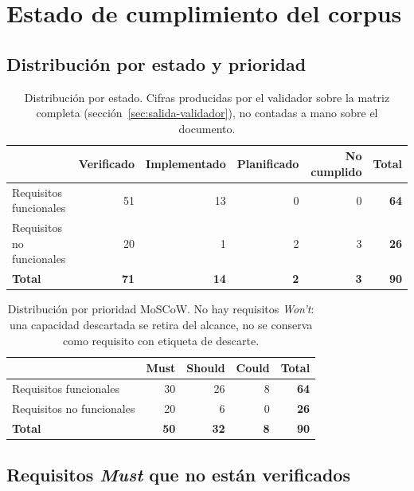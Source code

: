 \documentclass[11pt,a4paper]{article}
\begin{document}
\section{Estado de cumplimiento del corpus}
\label{sec:cumplimiento}

\subsection{Distribución por estado y prioridad}

\begin{table}[H]\centering\small
\begin{tabular}{lrrrrr}
\toprule
& \textbf{Verificado} & \textbf{Implementado} & \textbf{Planificado} & \textbf{No cumplido} &
\textbf{Total} \\
\midrule
Requisitos funcionales     & 51 & 13 & 0 & 0 & \textbf{64} \\
Requisitos no funcionales  & 20 &  1 & 2 & 3 & \textbf{26} \\
\midrule
\textbf{Total}             & \textbf{71} & \textbf{14} & \textbf{2} & \textbf{3} &
\textbf{90} \\
\bottomrule
\end{tabular}
\caption{Distribución por estado. Cifras producidas por el validador sobre la matriz completa
(sección~\ref{sec:salida-validador}), no contadas a mano sobre el documento.}
\end{table}

\begin{table}[H]\centering\small
\begin{tabular}{lrrrr}
\toprule
& \textbf{Must} & \textbf{Should} & \textbf{Could} & \textbf{Total} \\
\midrule
Requisitos funcionales    & 30 & 26 & 8 & \textbf{64} \\
Requisitos no funcionales & 20 &  6 & 0 & \textbf{26} \\
\midrule
\textbf{Total}            & \textbf{50} & \textbf{32} & \textbf{8} & \textbf{90} \\
\bottomrule
\end{tabular}
\caption{Distribución por prioridad MoSCoW. No hay requisitos \emph{Won't}: una capacidad
descartada se retira del alcance, no se conserva como requisito con etiqueta de descarte.}
\end{table}

\subsection{Requisitos \emph{Must} que no están verificados}
\end{document}
